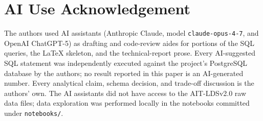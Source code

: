 
\section*{AI Use Acknowledgement}

The authors used AI assistants (Anthropic Claude, model
\texttt{claude-opus-4-7}, and OpenAI ChatGPT-5) as drafting and
code-review aides for portions of the SQL queries, the LaTeX skeleton,
and the technical-report prose. Every AI-suggested SQL statement was
independently executed against the project's PostgreSQL database by the
authors; no result reported in this paper is an AI-generated number.
Every analytical claim, schema decision, and trade-off discussion is
the authors' own. The AI assistants did not have access to the
AIT-LDSv2.0 raw data files; data exploration was performed locally in
the notebooks committed under \texttt{notebooks/}.

